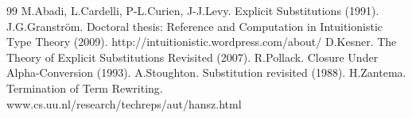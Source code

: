 \documentclass[11pt]{amsart}
\theoremstyle{plain}
\theoremstyle{definition}
\theoremstyle{remark}
\numberwithin{equation}{section}
\begin{document}
\begin{thebibliography}{99}
M.Abadi, L.Cardelli, P-L.Curien, J-J.Levy. Explicit Substitutions
(1991).
J.G.Granstr\"{o}m. Doctoral thesis: Reference and Computation in
Intuitionistic Type Theory (2009).
http://intuitionistic.wordpress.com/about/
D.Kesner. The Theory of Explicit Substitutions Revisited (2007).
R.Pollack. Closure Under Alpha-Conversion (1993).
A.Stoughton. Substitution revisited (1988).
H.Zantema. Termination of Term Rewriting.\\
www.cs.uu.nl/research/techreps/aut/hansz.html
\end{thebibliography}
\end{document}
